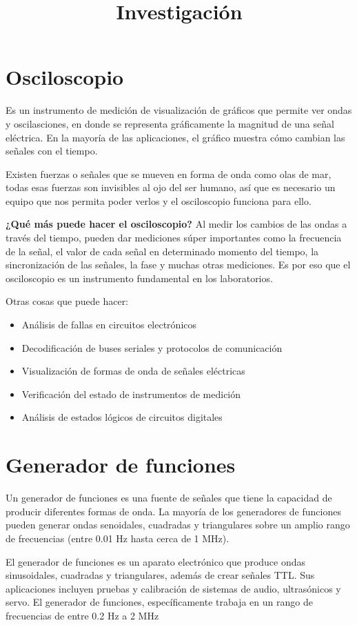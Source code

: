 \documentclass[a4paper,12pt]{article}
\title {\textbf{Investigación}}
\author{}
\date{}
\begin{document}
\maketitle
\section{Osciloscopio}
Es un instrumento de medición de visualización de gráficos que permite ver ondas y oscilasciones, en donde se representa gráficamente la magnitud de una señal eléctrica. En la mayoría de las aplicaciones, el gráfico muestra cómo cambian las señales con el tiempo.

Existen fuerzas o señales que se mueven en forma de onda como olas de mar, todas esas fuerzas son invisibles al ojo del ser humano, así que es necesario un equipo que nos permita poder verlos y el osciloscopio funciona para ello.

\textbf{¿Qué más puede hacer el osciloscopio?} Al medir los cambios de las ondas a través del tiempo, pueden dar mediciones súper importantes como la frecuencia de la señal, el valor de cada señal en determinado momento del tiempo, la sincronización de las señales, la fase y muchas otras mediciones. Es por eso que el osciloscopio es un instrumento fundamental en los laboratorios.

Otras cosas que puede hacer: 

\begin{itemize}
    \item Análisis de fallas en circuitos electrónicos
    \item Decodificación de buses seriales y protocolos de comunicación
    \item Visualización de formas de onda de señales eléctricas
    \item Verificación del estado de instrumentos de medición
    \item Análisis de estados lógicos de circuitos digitales
\end{itemize}
\section{Generador de funciones}
Un generador de funciones es una fuente de señales que tiene la capacidad de producir diferentes formas de onda. La mayoría de los generadores de funciones pueden generar ondas senoidales, cuadradas y triangulares sobre
 un amplio rango de frecuencias (entre 0.01 Hz hasta cerca de 1 MHz).

El generador de funciones es un aparato electrónico que produce ondas sinusoidales, cuadradas y triangulares, además de crear señales TTL. Sus aplicaciones incluyen pruebas y calibración de sistemas de audio, ultrasónicos y servo. El generador de funciones, específicamente trabaja en un rango de frecuencias de entre 0.2 Hz a 2 MHz
\end{document}
